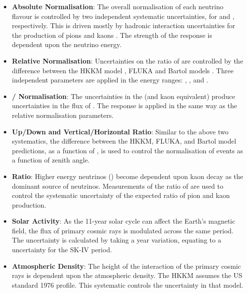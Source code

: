 \begin{itemize}
\item \textbf{Absolute Normalisation}: The overall normalisation of each neutrino flavour is controlled by two independent systematic uncertainties, for  and , respectively. This is driven mostly by hadronic interaction uncertainties for the production of pions and kaons \cite{Honda_2007}. The strength of the response is dependent upon the neutrino energy.
\item \textbf{Relative Normalisation}: Uncertainties on the ratio of  are controlled by the difference between the HKKM model \cite{Honda_2007}, FLUKA \cite{etde_20239111} and Bartol models \cite{Barr_2004}. Three independent parameters are applied in the energy ranges: , , and .
\item \textbf{\quickmath{\nu}/\quickmath{\bar{\nu}} Normalisation}: The uncertainties in the \quickmath{\pi^{+}/\pi^{-}} (and kaon equivalent) produce uncertainties in the flux of \quickmath{\nu/\bar{\nu}}. The response is applied in the same way as the relative normalisation parameters.
\item \textbf{Up/Down and Vertical/Horizontal Ratio}: Similar to the above two systematics, the difference between the HKKM, FLUKA, and Bartol model predictions, as a function of , is used to control the normalisation of events as a function of zenith angle.
\item{\textbf{ Ratio}}: Higher energy neutrinos () become dependent upon kaon decay as the dominant source of neutrinos. Measurements of the ratio of  \cite{Ambrosini1998-er} are used to control the systematic uncertainty of the expected ratio of pion and kaon production.
\item \textbf{Solar Activity}: As the 11-year solar cycle can affect the Earth's magnetic field, the flux of primary cosmic rays is modulated across the same period. The uncertainty is calculated by taking a  year variation, equating to a  uncertainty for the SK-IV period.
\item \textbf{Atmospheric Density}: The height of the interaction of the primary cosmic rays is dependent upon the atmospheric density. The HKKM assumes the US standard 1976 \cite{USStandardAtm} profile. This systematic controls the uncertainty in that model.
\end{itemize}

